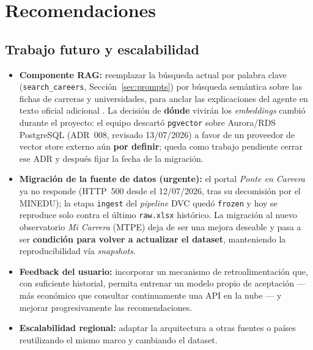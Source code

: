 \section{Recomendaciones}

\subsection{Trabajo futuro y escalabilidad}

\begin{itemize}[noitemsep]
  \item \textbf{Componente RAG:} reemplazar la b\'usqueda actual por palabra
        clave (\texttt{search\_careers}, Secci\'on~\ref{sec:prompts}) por
        b\'usqueda sem\'antica sobre las fichas de carreras y universidades,
        para anclar las explicaciones del agente en texto oficial adicional
        \cite{gao2024, fan2024}. La decisi\'on de \textbf{d\'onde} vivir\'an
        los \emph{embeddings} cambi\'o durante el proyecto: el equipo
        descart\'o \texttt{pgvector} sobre Aurora/RDS PostgreSQL (ADR~008,
        revisado 13/07/2026) a favor de un proveedor de vector store externo
        a\'un \textbf{por definir}; queda como trabajo pendiente cerrar ese
        ADR y despu\'es fijar la fecha de la migraci\'on.
  \item \textbf{Migraci\'on de la fuente de datos (urgente):} el portal
        \emph{Ponte en Carrera} ya no responde (HTTP~500 desde el
        12/07/2026, tras su decomisi\'on por el MINEDU); la etapa
        \texttt{ingest} del \emph{pipeline} DVC qued\'o \texttt{frozen} y hoy
        se reproduce solo contra el \'ultimo \texttt{raw.xlsx} hist\'orico. La
        migraci\'on al nuevo observatorio \emph{Mi Carrera} (MTPE) deja de ser
        una mejora deseable y pasa a ser \textbf{condici\'on para volver a
        actualizar el dataset}, manteniendo la reproducibilidad v\'ia
        \emph{snapshots}.
  \item \textbf{Feedback del usuario:} incorporar un mecanismo de retroalimentaci\'on
        que, con suficiente historial, permita entrenar un modelo propio de
        aceptaci\'on --- m\'as econ\'omico que consultar continuamente una API en
        la nube --- y mejorar progresivamente las recomendaciones.
  \item \textbf{Escalabilidad regional:} adaptar la arquitectura a otras fuentes o
        pa\'ises reutilizando el mismo marco y cambiando el dataset.
\end{itemize}

